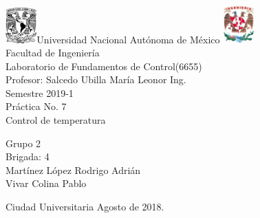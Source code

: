 

\begin{titlepage}
     \begin{center}
	\includegraphics[width=0.09\textwidth]{UNAM}\Large Universidad Nacional Autónoma de México
        	\includegraphics[width=0.09\textwidth]{FI}\\[1cm]
        \Large Facultad de Ingeniería\\[1cm]
         \Large Laboratorio de Fundamentos de Control(6655)\\[1cm]
         \footnotesize Profesor: Salcedo Ubilla María Leonor Ing.\\[1cm]
        \footnotesize Semestre 2019-1\\[1cm]
        
       

        \Large Práctica No. 7\\[1cm]
        
           

\Large Control de temperatura
        
          \begin{flushright}
\footnotesize  Grupo 2\\[0.5cm]
\footnotesize Brigada: 4\\[0.5cm]
\footnotesize Martínez López Rodrigo Adrián\\[0.5cm]
\footnotesize Vivar Colina Pablo\\[0.5cm]
 \end{flushright}
          \begin{flushleft}
        \footnotesize Ciudad Universitaria Agosto de 2018.\\
          \end{flushleft}
         
          
   \end{center}
\end{titlepage}
